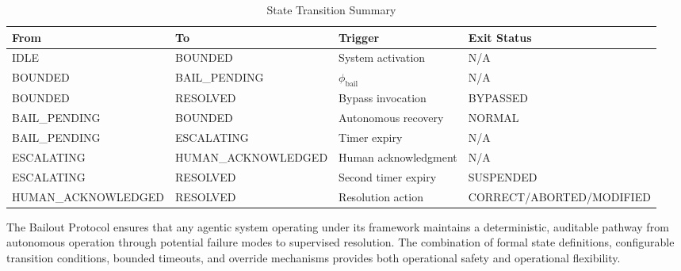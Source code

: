 \begin{table}[htbp]
\centering
\caption{State Transition Summary}
\label{tab:transition_summary}
\begin{tabular}{llll}
\toprule
\textbf{From} & \textbf{To} & \textbf{Trigger} & \textbf{Exit Status} \\
\midrule
IDLE & BOUNDED & System activation & N/A \\
BOUNDED & BAIL\_PENDING & $\phi_{\text{bail}}$ & N/A \\
BOUNDED & RESOLVED & Bypass invocation & BYPASSED \\
BAIL\_PENDING & BOUNDED & Autonomous recovery & NORMAL \\
BAIL\_PENDING & ESCALATING & Timer expiry & N/A \\
ESCALATING & HUMAN\_ACKNOWLEDGED & Human acknowledgment & N/A \\
ESCALATING & RESOLVED & Second timer expiry & SUSPENDED \\
HUMAN\_ACKNOWLEDGED & RESOLVED & Resolution action & CORRECT/ABORTED/MODIFIED \\
\bottomrule
\end{tabular}
\end{table}

The Bailout Protocol ensures that any agentic system operating under its framework maintains a deterministic, auditable pathway from autonomous operation through potential failure modes to supervised resolution. The combination of formal state definitions, configurable transition conditions, bounded timeouts, and override mechanisms provides both operational safety and operational flexibility.